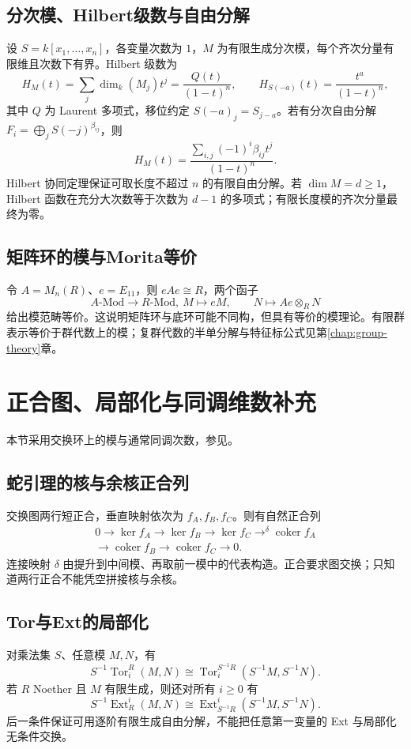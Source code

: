 \documentclass[../main.tex]{subfiles}
\begin{document}
\subsection{分次模、Hilbert级数与自由分解}
设 $S=k[x_1,\ldots,x_n]$，各变量次数为 $1$，$M$ 为有限生成分次模，每个齐次分量有限维且次数下有界。Hilbert 级数为
\[
H_M(t)=\sum_j\dim_k(M_j)t^j=\frac{Q(t)}{(1-t)^n},\qquad
H_{S(-a)}(t)=\frac{t^a}{(1-t)^n},
\]
其中 $Q$ 为 Laurent 多项式，移位约定 $S(-a)_j=S_{j-a}$。若有分次自由分解 $F_i=\bigoplus_jS(-j)^{\beta_{ij}}$，则
\[
H_M(t)=\frac{\sum_{i,j}(-1)^i\beta_{ij}t^j}{(1-t)^n}.
\]
Hilbert 协同定理保证可取长度不超过 $n$ 的有限自由分解。若 $\dim M=d\ge1$，Hilbert 函数在充分大次数等于次数为 $d-1$ 的多项式；有限长度模的齐次分量最终为零。

\subsection{矩阵环的模与Morita等价}
令 $A=M_n(R)$、$e=E_{11}$，则 $eAe\cong R$，两个函子
\[
A\text{-Mod}\longrightarrow R\text{-Mod},\ M\longmapsto eM,
\qquad N\longmapsto Ae\otimes_RN
\]
给出模范畴等价。这说明矩阵环与底环可能不同构，但具有等价的模理论。有限群表示等价于群代数上的模；复群代数的半单分解与特征标公式见第\ref{chap:group-theory}章。
\section{正合图、局部化与同调维数补充}
本节采用交换环上的模与通常同调次数，参见\cite{stacks,milneCA}。
\subsection{蛇引理的核与余核正合列}
交换图两行短正合，垂直映射依次为 $f_A,f_B,f_C$。则有自然正合列
\begin{gather*}
0\longrightarrow\ker f_A\longrightarrow\ker f_B\longrightarrow\ker f_C
\mathop{\longrightarrow}^{\delta}\operatorname{coker}f_A\\
\longrightarrow\operatorname{coker}f_B\longrightarrow\operatorname{coker}f_C\longrightarrow0.
\end{gather*}
连接映射 $\delta$ 由提升到中间模、再取前一模中的代表构造。正合要求图交换；只知道两行正合不能凭空拼接核与余核。
\subsection{Tor与Ext的局部化}
对乘法集 $S$、任意模 $M,N$，有
\[
S^{-1}\operatorname{Tor}_i^R(M,N)
\cong\operatorname{Tor}_i^{S^{-1}R}(S^{-1}M,S^{-1}N).
\]
若 $R$ Noether 且 $M$ 有限生成，则还对所有 $i\ge0$ 有
\[
S^{-1}\operatorname{Ext}_R^i(M,N)
\cong\operatorname{Ext}_{S^{-1}R}^i(S^{-1}M,S^{-1}N).
\]
后一条件保证可用逐阶有限生成自由分解，不能把任意第一变量的 Ext 与局部化无条件交换。
\end{document}
